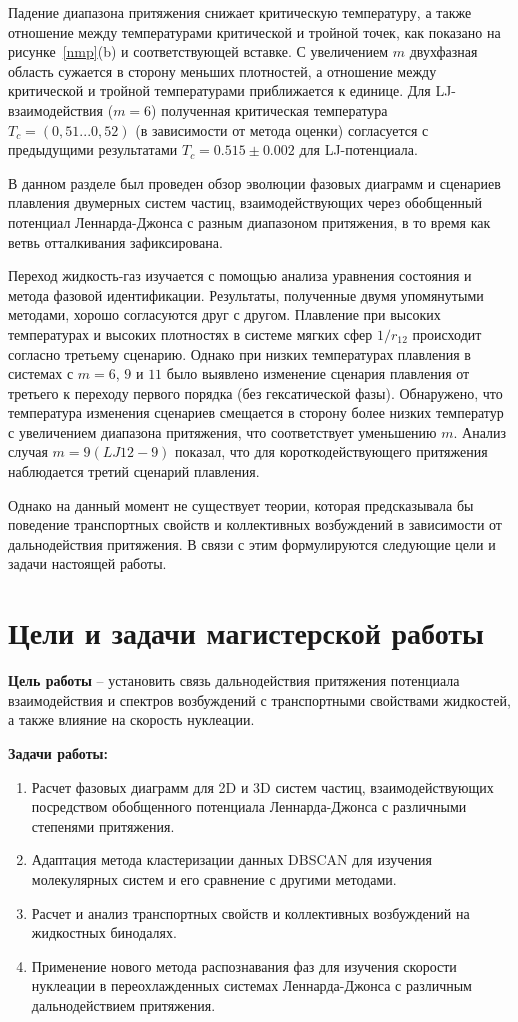 Падение диапазона притяжения снижает критическую температуру, а также отношение между температурами критической и тройной точек, как показано на рисунке~\ref{nmp}(b) и соответствующей вставке.
С увеличением $m$ двухфазная область сужается в сторону меньших плотностей, а отношение между критической и тройной температурами приближается к единице.
Для LJ-взаимодействия ($m = 6$) полученная критическая температура $T_c=(0,51 . . . 0,52)$ (в зависимости от метода оценки) согласуется с предыдущими результатами $T_c = 0.515 \pm 0.002$  для LJ-потенциала.

В данном разделе был проведен обзор эволюции фазовых диаграмм и сценариев плавления двумерных систем частиц, взаимодействующих через обобщенный потенциал Леннарда-Джонса с разным диапазоном притяжения, в то время как ветвь отталкивания зафиксирована.

Переход жидкость-газ изучается с помощью анализа уравнения состояния и метода фазовой идентификации.
Результаты, полученные двумя упомянутыми методами, хорошо согласуются друг с другом.
Плавление при высоких температурах и высоких плотностях в системе мягких сфер $1/r_{12}$ происходит согласно третьему сценарию. 
Однако при низких температурах плавления в системах с $m = 6$, $9$ и $11$ было выявлено изменение сценария плавления от третьего к переходу первого порядка (без гексатической фазы).
Обнаружено, что температура изменения сценариев смещается в сторону более низких температур с увеличением диапазона притяжения, что соответствует уменьшению $m$. 
Анализ случая $m = 9 (LJ12-9)$  показал, что для короткодействующего притяжения наблюдается третий сценарий плавления.

Однако на данный момент не существует теории, которая предсказывала бы поведение транспортных свойств и коллективных возбуждений в зависимости от дальнодействия притяжения.
В связи с этим формулируются следующие цели и задачи настоящей работы.

\section{Цели и задачи магистерской работы}

\textbf{Цель работы} -- установить связь дальнодействия притяжения потенциала взаимодействия и спектров возбуждений с транспортными свойствами жидкостей, а также влияние на скорость нуклеации.

\textbf{Задачи работы:}
\begin{enumerate}
\item Расчет фазовых диаграмм для 2D и 3D систем частиц, взаимодействующих посредством обобщенного потенциала Леннарда-Джонса с различными степенями притяжения.
\item Адаптация метода кластеризации данных DBSCAN для изучения молекулярных систем и его сравнение с другими методами.
\item Расчет и анализ транспортных свойств и коллективных возбуждений на жидкостных бинодалях.
\item Применение нового метода распознавания фаз для изучения скорости нуклеации в переохлажденных системах Леннарда-Джонса с различным дальнодействием притяжения.
\end{enumerate}
